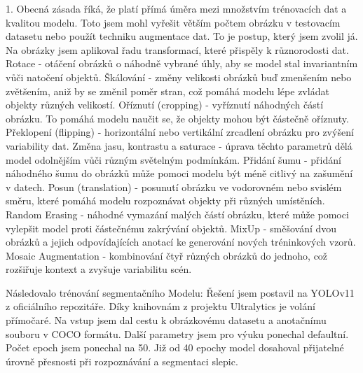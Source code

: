 1.	Obecná zásada říká, že platí přímá úměra mezi množstvím trénovacích dat a kvalitou modelu.
Toto jsem mohl vyřešit větším počtem obrázku v testovacím datasetu nebo použít techniku augmentace dat.
To je postup, který jsem zvolil já. Na obrázky jsem aplikoval řadu transformací, které přispěly k různorodosti dat.\newline
\newline
Rotace - otáčení obrázků o náhodně vybrané úhly, aby se model stal invariantním vůči natočení objektů.\newline
Škálování - změny velikosti obrázků buď zmenšením nebo zvětšením, aniž by se změnil poměr stran, což pomáhá modelu lépe zvládat objekty různých velikostí.\newline
Oříznutí (cropping) - vyříznutí náhodných částí obrázku. \newline
To pomáhá modelu naučit se, že objekty mohou být částečně oříznuty.\newline
Překlopení (flipping) - horizontální nebo vertikální zrcadlení obrázku pro zvýšení variability dat.\newline
Změna jasu, kontrastu a saturace - úprava těchto parametrů dělá model odolnějším vůči různým světelným podmínkám.\newline
Přidání šumu - přidání náhodného šumu do obrázků může pomoci modelu být méně citlivý na zašumění v datech.\newline
Posun (translation) - posunutí obrázku ve vodorovném nebo svislém směru, které pomáhá modelu rozpoznávat objekty při různých umístěních.\newline
Random Erasing - náhodné vymazání malých částí obrázku, které může pomoci vylepšit model proti částečnému zakrývání objektů.\newline
MixUp - směšování dvou obrázků a jejich odpovídajících anotací ke generování nových tréninkových vzorů.\newline
Mosaic Augmentation - kombinování čtyř různých obrázků do jednoho, což rozšiřuje kontext a zvyšuje variabilitu scén.\newline
\newline

Následovalo trénování segmentačního Modelu:
Řešení jsem postavil na YOLOv11 z oficiálního repozitáře.
Díky knihovnám z projektu Ultralytics je volání přímočaré.
Na vstup jsem dal cestu k obrázkovému datasetu a anotačnímu souboru v COCO formátu.
Další parametry jsem pro výuku ponechal defaultní.
Počet epoch jsem ponechal na 50.
Již od 40 epochy model dosahoval přijatelné úrovně přesnosti při rozpoznávání a segmentaci slepic.

